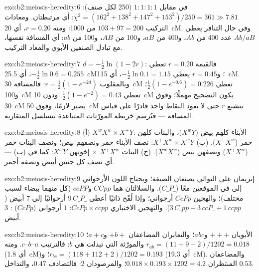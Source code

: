 \begin{solution}{exo:b2:meiosis-heredity:6}
في مقابل $1 : 1 : 1 : 1$ (250 لكل صنف): $\chi^2 = (162^2 + 138^2 + 147^2
+ 153^2)/250 = 361 \gg 7.81$: أي مرتبطتان. ومعادات التركيب $103 + 97 = 200$
من 1000: ومنه $r = 0.20$، أي \qty{20}{cM}. وفي حال التنافر يعطي $Ab/aB$ عدد 400
من $Ab$، و400 من $aB$، و100 من $AB$، و100 من $ab$: أي المسافة نفسها،
مع تبادل الصنفين الأبوي والمعاد التركيب.
\end{solution}

\begin{solution}{exo:b2:meiosis-heredity:7}
$d = -\tfrac12\ln(1 - 2r)$: فالقيمة $r = 0.20$ تعطي $-\tfrac12\ln 0.6 =
0.255$، أي \qty{25.5}{cM}؛ و$r = 0.45$ يعطي $-\tfrac12\ln 0.1 = 1.15$،
أي \qty{115}{cM}. وبالمقلوب $r = \tfrac12(1 - e^{-2d})$: فالمسافة \qty{30}{cM} تعطي
$\tfrac12(1 - e^{-0.6}) = 0.226$؛ و\qty{100}{cM} تعطي $\tfrac12(1 -
e^{-2}) = 0.43$. ودون \qty{10}{cM} يكون التصحيح مهملًا؛ وفوق
\qty{30}{cM} يصير لازمًا، وفوق \qty{50}{cM} يتشبع $r$ حتى لا يعود
 النقاط واحد قادرًا على قياس المسافة --- فتُرسم خريطة
المورّثات المتباعدة بتسلسل المتقاربة.
\end{solution}

\begin{solution}{exo:b2:meiosis-heredity:8}
(أ) $X^wX^w \times X^+Y$: الأبناء كلهم بيض ($X^wY$)، والبنات كلهن
حمر ($X^+X^w$). (ب) $X^+X^w \times X^wY$: نصف الأبناء حمر ونصفهم بيض؛
ونصف البنات حمر ($X^+X^w$) ونصفهن بيض ($X^wX^w$). (ج) البنات
$X^+X^w$ $\times$ إخوتهن $X^wY$: كما في (ب) --- أي نصف كل جنس
أبيض ونصفه أحمر.
\end{solution}

\begin{solution}{exo:b2:meiosis-heredity:9}
إنزيمان على التوالي يصنعان الصبغة؛ ويحتاج اللون الأرجواني إلى 
 في الموقعين معًا ($C\_P\_$). والسلالتان هما $CCpp$ و$ccPP$
(كل منهما بيضاء لسبب مختلف)؛ والهجين $CcPp$ أرجواني؛
وإذا لُقّح ذاتيًا أعطى $9\,C\_P\_$ أرجوانيًا إلى $7$ أبيض ($3\,C\_pp + 3\,ccP\_ +
1\,ccpp$). والتهجين الاختباري $CcPp\times ccpp$: $1$ أرجواني ($CcPp$) : $3$
أبيض.
\end{solution}

\begin{solution}{exo:b2:meiosis-heredity:10}
الأبويان $+++$ و$abc$؛ والتعابران المضاعفان $+b+$ و$a+c$؛ والمورّثة
التي تبدلت هي $b$: فالترتيب $a$--$b$--$c$. ومنه $r_{ab} = (11 + 9 + 2)/1202
= 0.018$ (أي \qty{1.8}{cM})؛ و$r_{bc} = (118 + 112 + 2)/1202 = 0.193$
(أي \qty{19.3}{cM}). والمضاعفان المنتظران $0.018\times 0.193\times 1202 =
4.2$؛ والمرصودان 2: فالتصادف $0.47$، والتداخل $0.53$.
\end{solution}

